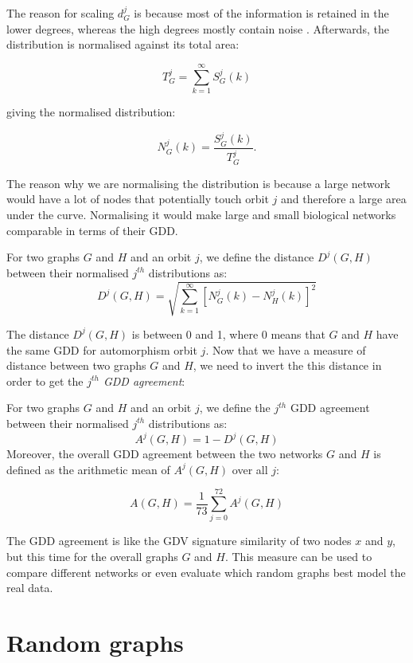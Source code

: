 The reason for scaling \( d_G^j\) is because most of the information is retained in the lower
degrees, whereas the high degrees mostly contain
noise \cite{prvzulj2007biological}. Afterwards, the distribution is normalised
against its total area:

$$ T_G^j = \sum_{k=1}^{\infty}S_G^j(k) $$

giving the normalised distribution:

$$ N_G^j(k) = \frac{S_G^j(k)}{T_G^j}. $$

The reason why we are normalising the distribution is because a large
network would have a lot of nodes that potentially touch orbit $j$ and therefore a
large area under the curve. Normalising it would make large and small
biological networks comparable in terms of their GDD. 

\begin{mydef}
For two graphs $G$ and $H$ and an orbit $j$, we define the distance \( D^j(G,H) \) between their normalised $j^{th}$ distributions as:
$$ D^j(G,H) = \sqrt{\sum_{k=1}^{\infty}[N_G^j(k) - N_H^j(k)]^2} $$
\end{mydef}

The distance \( D^j(G,H) \) is between 0 and 1, where 0 means that $G$ and $H$ have
the same GDD for automorphism orbit $j$. Now that we have a measure of distance between two graphs $G$ and $H$, we need to invert the this distance in order to get the \emph{$j^{th}$ GDD agreement}:

\begin{mydef}

For two graphs $G$ and $H$ and an orbit $j$, we define the $j^{th}$ GDD agreement between their normalised $j^{th}$ distributions as:
$$ A^j(G, H) = 1 - D^j(G,H)$$
Moreover, the overall GDD agreement between the two
networks $G$ and $H$ is defined as the arithmetic mean of \( A^j(G,H) \) over all $j$:
 
$$ A(G,H) = \frac{1}{73}\sum_{j=0}^{72}A^j(G,H) $$  
\end{mydef}

The GDD agreement is like the GDV signature similarity of two nodes $x$ and $y$, but this time for the overall graphs $G$ and $H$. This measure can be used to compare different networks or even evaluate which random graphs best model the real data.

\section{Random graphs}

